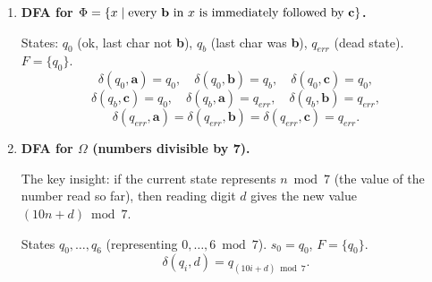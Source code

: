 \documentclass[11pt]{book}
\begin{document}
\begin{enumerate}[{1.}1.]
\begin{itemize}
  \item $q_s$: start (no characters read yet).
  \item $q_m$: at least one character read; string does not start with \textbf{d} and no \textbf{bb} seen; last char was not \textbf{b}.
  \item $q_b$: same as $q_m$ but last char was \textbf{b} (pending \textbf{bb}).
  \item $q_1$: accepting sink (string starts with \textbf{d}, or \textbf{bb} has been seen).
\end{itemize}
$F=\{q_1\}$.
\[
\begin{array}{c|ccc}
       & \mathbf{a} & \mathbf{b} & \mathbf{d} \\\hline
q_s    & q_m        & q_b        & q_1        \\
q_m    & q_m        & q_b        & q_m        \\
q_b    & q_m        & q_1        & q_m        \\
q_1    & q_1        & q_1        & q_1
\end{array}
\]
\emph{Spot-check}: \textbf{bd} — $q_s\xrightarrow{b}q_b\xrightarrow{d}q_m$, rejected. \checkmark\quad
\textbf{bb} — $q_s\xrightarrow{b}q_b\xrightarrow{b}q_1$, accepted. \checkmark\quad
\textbf{d} — $q_s\xrightarrow{d}q_1$, accepted. \checkmark

\item \textbf{DFA for $\Phi = \{x\mid\text{every \textbf{b} in }x\text{ is immediately followed by }\mathbf{c}\}$.}

States: $q_0$ (ok, last char not \textbf{b}), $q_b$ (last char was \textbf{b}), $q_{err}$ (dead state). $F = \{q_0\}$.
\[
\delta(q_0,\mathbf{a})=q_0,\quad\delta(q_0,\mathbf{b})=q_b,\quad\delta(q_0,\mathbf{c})=q_0,
\]
\[
\delta(q_b,\mathbf{c})=q_0,\quad\delta(q_b,\mathbf{a})=q_{err},\quad\delta(q_b,\mathbf{b})=q_{err},
\]
\[
\delta(q_{err},\mathbf{a})=\delta(q_{err},\mathbf{b})=\delta(q_{err},\mathbf{c})=q_{err}.
\]

\item \textbf{DFA for $\Omega$ (numbers divisible by 7).}

The key insight: if the current state represents $n\bmod 7$ (the value of the number read so far), then reading digit $d$ gives the new value $(10n+d)\bmod 7$.

States $q_0,\ldots,q_6$ (representing $0,\ldots,6\bmod 7$). $s_0=q_0$, $F=\{q_0\}$.
\[
\delta(q_i, d) = q_{(10i+d)\bmod 7}.
\]


\end{enumerate}
\end{document}
